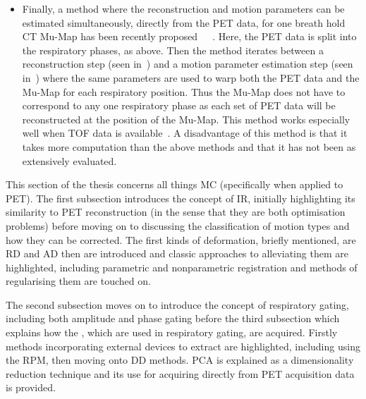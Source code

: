 \begin{itemize}
                \item Finally, a method where the reconstruction and motion parameters can be estimated simultaneously, directly from the \gls{PET} data, for one breath hold \gls{CT} \gls{Mu-Map} has been recently proposed~~~. Here, the \gls{PET} data is split into the respiratory phases, as above. Then the method iterates between a reconstruction step (seen in~) and a motion parameter estimation step (seen in~) where the same parameters are used to warp both the \gls{PET} data and the \gls{Mu-Map} for each respiratory position. Thus the \gls{Mu-Map} does not have to correspond to any one respiratory phase as each set of \gls{PET} data will be reconstructed at the position of the \gls{Mu-Map}. This method works especially well when \gls{TOF} data is available~. A disadvantage of this method is that it takes more computation than the above methods and that it has not been as extensively evaluated.
            \end{itemize}
    
        This section of the thesis concerns all things \gls{MC} (specifically when applied to \gls{PET}). The first subsection introduces the concept of \gls{IR}, initially highlighting its similarity to \gls{PET} reconstruction (in the sense that they are both optimisation problems) before moving on to discussing the classification of motion types and how they can be corrected. The first kinds of deformation, briefly mentioned, are \gls{RD} and \gls{AD} then  are introduced and classic approaches to alleviating them are highlighted, including parametric and nonparametric registration and methods of regularising them are touched on.
        
        The second subsection moves on to introduce the concept of respiratory gating, including both amplitude and phase gating before the third subsection which explains how the , which are used in respiratory gating, are acquired. Firstly methods incorporating external devices to extract  are highlighted, including using the \gls{RPM}, then moving onto \gls{DD} methods. \gls{PCA} is explained as a dimensionality reduction technique and its use for acquiring  directly from \gls{PET} acquisition data is provided.
        
